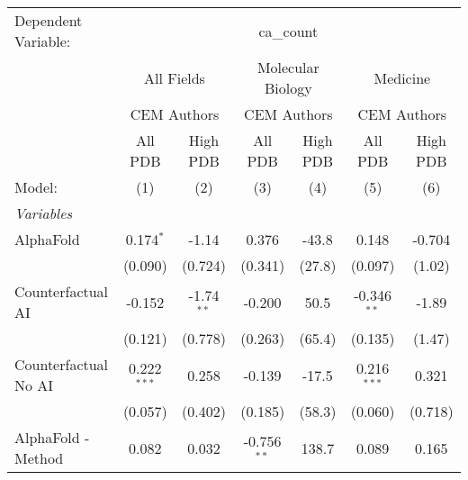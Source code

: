 \begingroup
\centering
\begin{tabular}{lcccccc}
   \tabularnewline \midrule \midrule
   Dependent Variable: & \multicolumn{6}{c}{ca\_count}\\
 & \multicolumn{2}{c}{All Fields} & \multicolumn{2}{c}{Molecular Biology} & \multicolumn{2}{c}{Medicine} \\
\cmidrule(lr){2-3} \cmidrule(lr){4-5} \cmidrule(lr){6-7}
 & \multicolumn{2}{c}{CEM Authors} & \multicolumn{2}{c}{CEM Authors} & \multicolumn{2}{c}{CEM Authors} \\
\cmidrule(lr){2-3} \cmidrule(lr){4-5} \cmidrule(lr){6-7}
 & \multicolumn{1}{c}{All PDB} & \multicolumn{1}{c}{High PDB} & \multicolumn{1}{c}{All PDB} & \multicolumn{1}{c}{High PDB} & \multicolumn{1}{c}{All PDB} & \multicolumn{1}{c}{High PDB} \\
\cmidrule(lr){2-2} \cmidrule(lr){3-3} \cmidrule(lr){4-4} \cmidrule(lr){5-5} \cmidrule(lr){6-6} \cmidrule(lr){7-7}
   Model:                                                     & (1)            & (2)          & (3)           & (4)           & (5)           & (6)\\  
   \midrule
   \emph{Variables}\\
   AlphaFold                                                  & 0.174$^{*}$    & -1.14        & 0.376         & -43.8         & 0.148         & -0.704\\   
                                                              & (0.090)        & (0.724)      & (0.341)       & (27.8)        & (0.097)       & (1.02)\\   
   Counterfactual AI                                          & -0.152         & -1.74$^{**}$ & -0.200        & 50.5          & -0.346$^{**}$ & -1.89\\   
                                                              & (0.121)        & (0.778)      & (0.263)       & (65.4)        & (0.135)       & (1.47)\\   
   Counterfactual No AI                                       & 0.222$^{***}$  & 0.258        & -0.139        & -17.5         & 0.216$^{***}$ & 0.321\\   
                                                              & (0.057)        & (0.402)      & (0.185)       & (58.3)        & (0.060)       & (0.718)\\   
   AlphaFold - Method                                         & 0.082          & 0.032        & -0.756$^{**}$ & 138.7         & 0.089         & 0.165\\   

\end{tabular}
